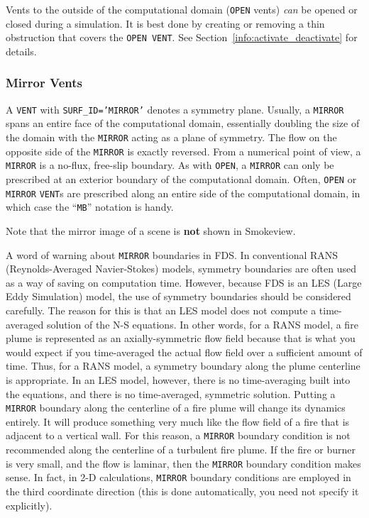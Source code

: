 \documentclass[11pt]{book}
\newcommand{\ct}{\tt\small}
\begin{document}
\begin{warning}
Vents to the outside of the computational domain ({\ct OPEN} vents)
{\em  can} be opened or closed during a simulation. It is best done by creating or removing a thin obstruction that covers the {\ct OPEN VENT}.
See Section~\ref{info:activate_deactivate} for details.
\end{warning}

\subsubsection{Mirror Vents}

A {\ct VENT} with {\ct SURF\_ID='MIRROR'} denotes a symmetry plane. Usually, a {\ct MIRROR} spans an entire face of the computational
domain, essentially doubling the size of the domain with the {\ct MIRROR} acting as a plane of symmetry. The flow on the opposite side of the
{\ct MIRROR} is exactly reversed. From a numerical point of view, a {\ct MIRROR} is a no-flux, free-slip boundary. As with {\ct OPEN}, a {\ct MIRROR} can only be prescribed at an exterior boundary of the computational domain. Often, {\ct OPEN} or {\ct MIRROR} {\ct VENT}s are prescribed along an
entire side of the computational domain, in which case the ``{\ct MB}'' notation is handy.

\begin{warning}
\noindent
Note that the mirror image of a scene is {\bf not} shown in Smokeview.
\end{warning}

\noindent
A word of warning about {\ct MIRROR} boundaries in FDS. In conventional RANS (Reynolds-Averaged Navier-Stokes) models, symmetry boundaries are often used as a way of saving on computation time. However, because FDS is an LES (Large Eddy Simulation) model, the use of symmetry boundaries should be considered carefully. The reason for this is that an LES model does not compute a time-averaged solution of the N-S equations. In other words, for a RANS model, a fire plume is represented as an axially-symmetric flow field because that is what you would expect if you time-averaged the actual flow field over a sufficient amount of time. Thus, for a RANS model, a symmetry boundary along the plume centerline is appropriate. In an LES model, however, there is no time-averaging built into the equations, and there is no time-averaged, symmetric solution. Putting a {\ct MIRROR} boundary along the centerline of a fire plume will change its dynamics entirely. It will produce something very much like the flow field of a fire that is adjacent to a vertical wall. For this reason, a {\ct MIRROR} boundary condition is not recommended along the centerline of a turbulent fire plume. If the fire or burner is very small, and the flow is laminar, then the {\ct MIRROR} boundary condition makes sense. In fact, in 2-D calculations, {\ct MIRROR} boundary conditions are employed in the third coordinate direction (this is done automatically, you need not specify it explicitly).
\end{document}
